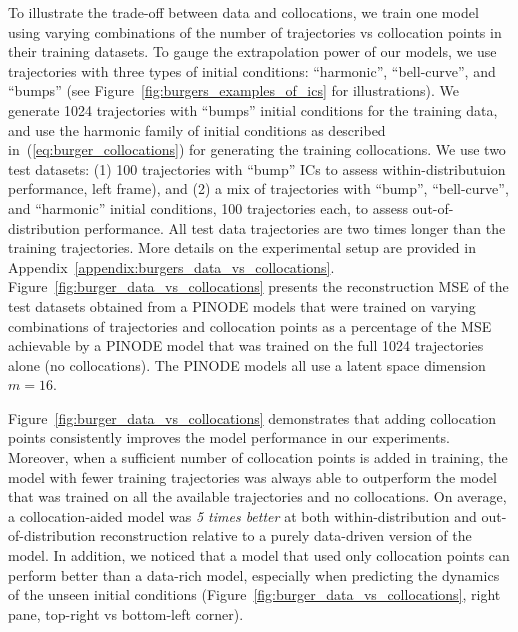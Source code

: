 To illustrate the trade-off between data and collocations, we train one model using varying combinations of the number of trajectories vs collocation points in their training datasets. To gauge the extrapolation power of our models, we use trajectories with three types of initial conditions: ``harmonic'', ``bell-curve'', and ``bumps'' (see Figure~\ref{fig:burgers_examples_of_ics} for illustrations). We generate 1024 trajectories with ``bumps'' initial conditions for the training data, and use the harmonic family of initial conditions as described in~(\ref{eq:burger_collocations}) for generating the training collocations. We use two test datasets: (1) 100 trajectories with ``bump'' ICs to assess within-distributuion performance, left frame), and (2) a mix of trajectories with ``bump'', ``bell-curve'', and ``harmonic'' initial conditions, 100 trajectories each, to assess out-of-distribution performance. All test data trajectories are two times longer than the training trajectories. More details on the experimental setup are provided in Appendix~\ref{appendix:burgers_data_vs_collocations}. Figure~\ref{fig:burger_data_vs_collocations} presents the reconstruction MSE of the test datasets obtained from a PINODE models that were trained on varying combinations of trajectories and collocation points as a percentage of the MSE achievable by a PINODE model that was trained on the full 1024 trajectories alone (no collocations). The PINODE models all use a latent space dimension $m=16$. 


Figure~\ref{fig:burger_data_vs_collocations} demonstrates that adding collocation points consistently improves the model performance in our experiments.  Moreover, when a sufficient number of collocation points is added in training, the model with fewer training trajectories was always able to outperform the model that was trained on all the available trajectories and no collocations. On average, a collocation-aided model was \textit{5 times better} at both within-distribution and out-of-distribution reconstruction relative to a purely data-driven version of the model. In addition, we noticed that a model that used only collocation points can perform better than a data-rich model, especially when predicting the dynamics of the unseen initial conditions (Figure~\ref{fig:burger_data_vs_collocations}, right pane, top-right vs bottom-left corner). 

